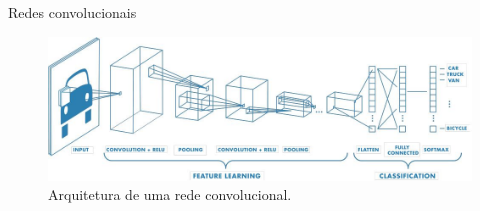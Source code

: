 \documentclass{beamer}
\begin{document}
\begin{frame}{Redes convolucionais}
        \begin{figure}[!ht]
            \centering
            \includegraphics[width=0.95\columnwidth]{
                Imagens/CNN_mathworks.jpg
            }
            \caption{Arquitetura de uma rede convolucional. }
            \label{fig:cnn}
        \end{figure}





\end{frame}
\end{document}
